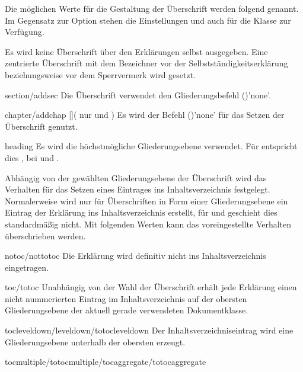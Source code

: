 \begin{Declaration*}{}
\begin{Declaration*}{}
\begin{Declaration*}{}
\begin{Declaration}
Die möglichen Werte für die Gestaltung der Überschrift werden folgend genannt. 
Im Gegensatz zur Option  stehen die Einstellungen 
 und  auch für die Klasse 
 zur Verfügung.
%
\begin{values}{}
\itemfalse
  Es wird keine Überschrift über den Erklärungen selbst ausgegeben.
\itemtrue*
  Eine zentrierte Überschrift mit dem Bezeichner  vor 
  der Selbstständigkeitserklärung beziehungsweise  vor dem 
  Sperrvermerk wird gesetzt. 
\item[section/addsec]
  Die Überschrift verwendet den Gliederungsbefehl 
  ()'none'.
\item[chapter/addchap][\Class{tudscrbook}](%
    nur  und %
  )
  Es wird der Befehl ()'none' für das 
  Setzen der Überschrift genutzt. 
\item[heading]
  Es wird die höchstmögliche Gliederungsebene verwendet. Für 
   entspricht dies , bei 
   und  .
\end{values}
%
Abhängig von der gewählten Gliederungsebene der Überschrift wird das Verhalten 
für das Setzen eines Eintrages ins Inhaltsverzeichnis festgelegt. Normalerweise 
wird nur für Überschriften in Form einer Gliederungsebene ein Eintrag der 
Erklärung ins Inhaltsverzeichnis erstellt, für  und 
 geschieht dies standardmäßig nicht. Mit folgenden 
Werten kann das voreingestellte Verhalten überschrieben werden.
%
\begin{values}{}
\item[notoc/nottotoc]
  Die Erklärung wird definitiv nicht ins Inhaltsverzeichnis eingetragen.
\item[toc/totoc]
  Unabhängig von der Wahl der Überschrift erhält jede Erklärung einen nicht
  nummerierten Eintrag im Inhaltsverzeichnis auf der obersten Gliederungsebene 
  der aktuell gerade verwendeten Dokumentklasse. 
\item[tocleveldown/leveldown/totocleveldown]
  Der Inhaltsverzeichniseintrag wird eine Gliederungsebene unterhalb der 
  obersten erzeugt.
\item[tocmultiple/totocmultiple/tocaggregate/totocaggregate]

\end{values}
\end{Declaration}
\end{Declaration*}
\end{Declaration*}
\end{Declaration*}
